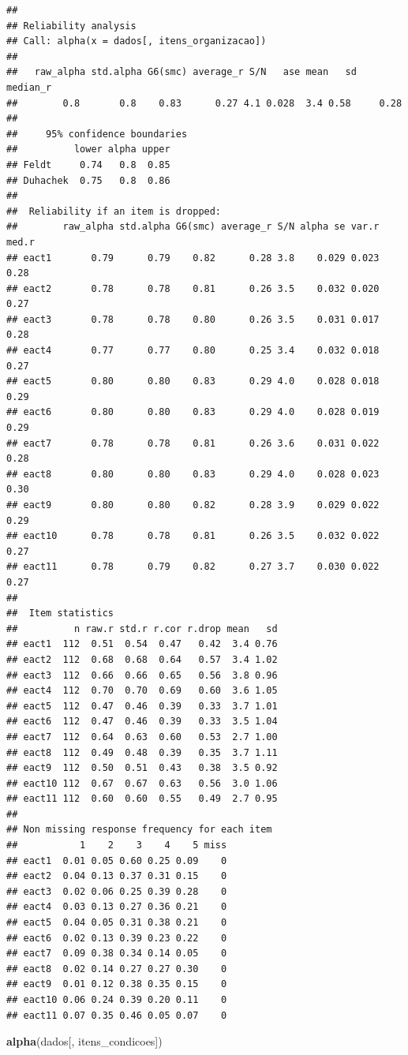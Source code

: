 \documentclass[
]{article}
\newenvironment{Shaded}{\begin{snugshade}}{\end{snugshade}}
\newcommand{\FunctionTok}[1]{\textcolor[rgb]{0.13,0.29,0.53}{\textbf{#1}}}
\newcommand{\NormalTok}[1]{#1}
\begin{document}
\begin{verbatim}
## 
## Reliability analysis   
## Call: alpha(x = dados[, itens_organizacao])
## 
##   raw_alpha std.alpha G6(smc) average_r S/N   ase mean   sd median_r
##        0.8       0.8    0.83      0.27 4.1 0.028  3.4 0.58     0.28
## 
##     95% confidence boundaries 
##          lower alpha upper
## Feldt     0.74   0.8  0.85
## Duhachek  0.75   0.8  0.86
## 
##  Reliability if an item is dropped:
##        raw_alpha std.alpha G6(smc) average_r S/N alpha se var.r med.r
## eact1       0.79      0.79    0.82      0.28 3.8    0.029 0.023  0.28
## eact2       0.78      0.78    0.81      0.26 3.5    0.032 0.020  0.27
## eact3       0.78      0.78    0.80      0.26 3.5    0.031 0.017  0.28
## eact4       0.77      0.77    0.80      0.25 3.4    0.032 0.018  0.27
## eact5       0.80      0.80    0.83      0.29 4.0    0.028 0.018  0.29
## eact6       0.80      0.80    0.83      0.29 4.0    0.028 0.019  0.29
## eact7       0.78      0.78    0.81      0.26 3.6    0.031 0.022  0.28
## eact8       0.80      0.80    0.83      0.29 4.0    0.028 0.023  0.30
## eact9       0.80      0.80    0.82      0.28 3.9    0.029 0.022  0.29
## eact10      0.78      0.78    0.81      0.26 3.5    0.032 0.022  0.27
## eact11      0.78      0.79    0.82      0.27 3.7    0.030 0.022  0.27
## 
##  Item statistics 
##          n raw.r std.r r.cor r.drop mean   sd
## eact1  112  0.51  0.54  0.47   0.42  3.4 0.76
## eact2  112  0.68  0.68  0.64   0.57  3.4 1.02
## eact3  112  0.66  0.66  0.65   0.56  3.8 0.96
## eact4  112  0.70  0.70  0.69   0.60  3.6 1.05
## eact5  112  0.47  0.46  0.39   0.33  3.7 1.01
## eact6  112  0.47  0.46  0.39   0.33  3.5 1.04
## eact7  112  0.64  0.63  0.60   0.53  2.7 1.00
## eact8  112  0.49  0.48  0.39   0.35  3.7 1.11
## eact9  112  0.50  0.51  0.43   0.38  3.5 0.92
## eact10 112  0.67  0.67  0.63   0.56  3.0 1.06
## eact11 112  0.60  0.60  0.55   0.49  2.7 0.95
## 
## Non missing response frequency for each item
##           1    2    3    4    5 miss
## eact1  0.01 0.05 0.60 0.25 0.09    0
## eact2  0.04 0.13 0.37 0.31 0.15    0
## eact3  0.02 0.06 0.25 0.39 0.28    0
## eact4  0.03 0.13 0.27 0.36 0.21    0
## eact5  0.04 0.05 0.31 0.38 0.21    0
## eact6  0.02 0.13 0.39 0.23 0.22    0
## eact7  0.09 0.38 0.34 0.14 0.05    0
## eact8  0.02 0.14 0.27 0.27 0.30    0
## eact9  0.01 0.12 0.38 0.35 0.15    0
## eact10 0.06 0.24 0.39 0.20 0.11    0
## eact11 0.07 0.35 0.46 0.05 0.07    0
\end{verbatim}

\begin{Shaded}
\begin{Highlighting}[]
\FunctionTok{alpha}\NormalTok{(dados[, itens\_condicoes])}
\end{Highlighting}
\end{Shaded}
\end{document}
